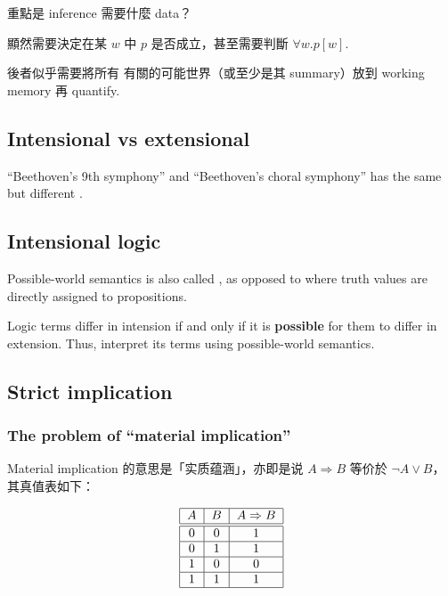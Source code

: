 重點是 inference 需要什麼 data？

顯然需要決定在某 $w$ 中 $p$ 是否成立，甚至需要判斷 $\forall w. p [w]$.

後者似乎需要將所有 有關的可能世界（或至少是其 summary）放到 working memory 再 quantify.  

\subsection{Intensional vs extensional}

``Beethoven's 9th symphony'' and ``Beethoven's choral symphony'' has the same  but different .

\subsection{Intensional logic}

Possible-world semantics is also called , as opposed to  where truth values are directly assigned to propositions.

Logic terms differ in intension if and only if it is \textbf{possible} for them to differ in extension.  Thus,  interpret its terms using possible-world semantics.

\subsection{Strict implication}
\label{sec:strict-implication}

\subsubsection{The problem of ``material implication''}

Material implication 的意思是「实质蕴涵」，亦即是说 $A \Rightarrow B$ 等价於 $\neg A \vee B$，其真值表如下：

\begin{equation}
\label{eqn:implication-truth-table}
\begin{tabular}{|c|c|c|}
\hline 
$A$ & $B$ & $A \Rightarrow B$ \\ 
\hline \hline 
0 & 0 & 1 \\
\hline 
0 & 1 & 1 \\ 
\hline 
1 & 0 & 0 \\ 
\hline 
1 & 1 & 1 \\ 
\hline 
\end{tabular} 
\end{equation}

